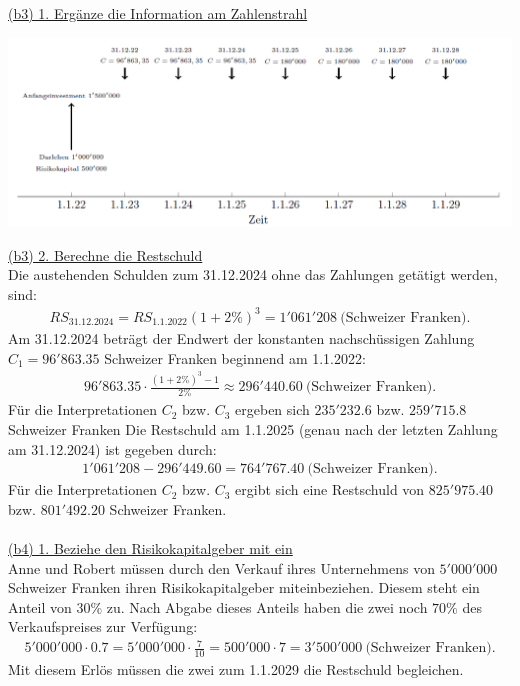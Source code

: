 \newpage
\underline{(b3) 1. Ergänze die Information am Zahlenstrahl}\\
\begin{center}
	\includegraphics[scale=0.54]{pictures/zeitstrahl_1_b_filled_3}
\end{center}
\underline{(b3) 2. Berechne die Restschuld}\\
Die austehenden Schulden zum 31.12.2024 ohne das Zahlungen  getätigt werden, sind:
\begin{align*}
	RS_{\mathrm{31.12.2024}}
	=
	RS_{\mathrm{1.1.2022}}
	(1 + 2 \%)^3
	= 
	1 '061' 208 \ \textrm{(Schweizer Franken)}.
\end{align*} 
Am 31.12.2024 beträgt der Endwert der konstanten nachschüssigen Zahlung $C_1 = 96' 863.35$ Schweizer Franken beginnend am 1.1.2022:
\begin{align*}
	96'863.35 \cdot
	\frac{(1+ 2 \%)^3 - 1}{2 \%}
	\approx 
	296 '440.60 \ \textrm{(Schweizer Franken)}.
\end{align*}
Für die Interpretationen $C_2 $ bzw. $C_3$ ergeben sich 
$235 '232.6$ bzw. $259' 715.8$ Schweizer Franken
Die Restschuld am 1.1.2025 (genau nach der letzten Zahlung am 31.12.2024) ist gegeben durch:
\begin{align*}
	1 '061 '208
	-
	296 '449.60
	=
	764 '767.40 \ \textrm{(Schweizer Franken)}.
\end{align*}
Für die Interpretationen $C_2$ bzw. $C_3$ ergibt sich eine Restschuld von $825'975.40$ bzw. $801'492.20$ Schweizer Franken.\\
\\
\underline{(b4) 1. Beziehe den Risikokapitalgeber mit ein}\\
Anne und Robert müssen durch den Verkauf ihres Unternehmens von $5 '000 '000 $ Schweizer Franken ihren Risikokapitalgeber miteinbeziehen. Diesem steht ein Anteil von $30 \%$ zu. Nach Abgabe dieses Anteils haben die zwei noch $70 \% $ des Verkaufspreises zur Verfügung:
\begin{align*}
	5' 000 '000 \cdot 0.7 
	= 
	5' 000 '000 \cdot \frac{7}{10}
	=
	500'000 \cdot 7 
	=
	3'500'000 \ \textrm{(Schweizer Franken)}.
\end{align*}
Mit diesem Erlös müssen die zwei zum 1.1.2029 die Restschuld begleichen.\\
\\
 
